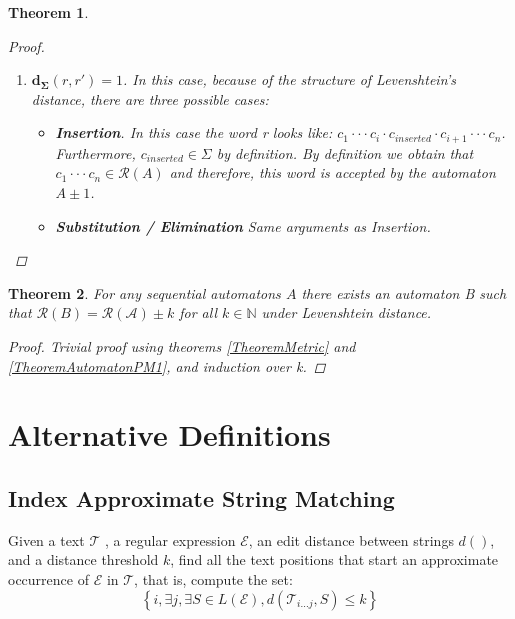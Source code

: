 \documentclass{article}
\newcommand{\set}[1]{\left\{#1\right\}}
\newtheorem{theorem}{Theorem}
\begin{document}
\begin{theorem}
\begin{proof}
\begin{enumerate}
            \item $\mathbf{d_\Sigma}(r, r') = 1$. In this case,
            because of the structure of Levenshtein's distance,
            there are three possible cases:

            \begin{itemize}
                \item \textbf{Insertion}. In this case the word r looks like:
		    $c_1 \cdot\cdot\cdot c_i \cdot c_{inserted}
		    \cdot c_{i + 1} \cdot\cdot\cdot c_n$. Furthermore,
		    $c_{inserted} \in \Sigma$ by definition.
		    By definition we obtain that $c_1\cdot\cdot\cdot c_n \in
		    \mathcal{R}(A)$ and therefore, this word is accepted by the
		    automaton $A\pm1$.
                \item \textbf{Substitution / Elimination} Same arguments as Insertion.
            \end{itemize}
        \end{enumerate}
    \end{proof}
\end{theorem}

\begin{theorem}
    For any sequential automatons $A$ there exists an automaton B such that $\mathcal{R}(B) = \mathcal{R(A)} \pm k$ for all $k\in \mathbb{N}$ under Levenshtein distance.
    \begin{proof}
        Trivial proof using theorems \ref{TheoremMetric} and \ref{TheoremAutomatonPM1}, and induction over k.
    \end{proof}
\end{theorem}


\section{Alternative Definitions}

\subsection{Index Approximate String Matching}

Given a text $\mathcal{T}$ , a regular expression $\mathcal{E}$,
an edit distance between strings $d()$, and a distance threshold
$k$, find all the text positions that start an approximate occurrence
of $\mathcal{E}$ in $\mathcal{T}$, that is, compute the set:
\begin{equation*}
    \set{i, \exists j, \exists S \in L(\mathcal{E}), d(\mathcal{T}_{i...j} , S) \leq k}
\end{equation*}
\end{document}
